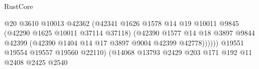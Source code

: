 \begin{lexlean}{RustCore}
\begin{coremodule}
                                                        @20
                                                        @3610
                                                        @10013
                                                        @42362
                                                        (@42341
                                                          @1626
                                                          @1578
                                                          @14
                                                          @19
                                                          @10011
                                                          @9845
                                                          (@42290 @1625 @10011 @37114 @37118)
                                                          (@42390
                                                            @1577
                                                            @14
                                                            @18
                                                            @3897
                                                            @9844
                                                            @42399
                                                            (@42390
                                                              @1404
                                                              @14
                                                              @17
                                                              @3897
                                                              @9004
                                                              @42399
                                                              @42778))))))
                                                  @19551
                                                  @19554
                                                  @19557
                                                  @19560
                                                  @22110)
                                                (@14068
                                                  @13793
                                                  @2429
                                                  @203
                                                  @171
                                                  @192
                                                  @11
                                                  @2408
                                                  @2425
                                                  @2540

\end{coremodule}
\end{lexlean}
